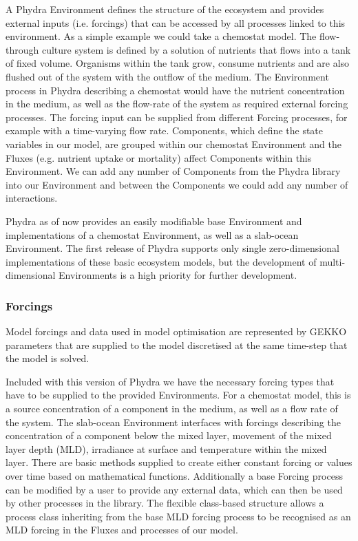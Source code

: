 \documentclass[template.tex]{subfiles}
\begin{document}
A Phydra Environment defines the structure of the ecosystem and provides external inputs (i.e. forcings) that can be accessed by all processes linked to this environment. As a simple example we could take a chemostat model. The flow-through culture system is defined by a solution of nutrients that flows into a tank of fixed volume. Organisms within the tank grow, consume nutrients and are also flushed out of the system with the outflow of the medium. The Environment process in Phydra describing a chemostat would have the nutrient concentration in the medium, as well as the flow-rate of the system as required external forcing processes. The forcing input can be supplied from different Forcing processes, for example with a time-varying flow rate. Components, which define the state variables in our model, are grouped within our chemostat Environment and the Fluxes (e.g. nutrient uptake or mortality) affect Components within this Environment. We can add any number of Components from the Phydra library into our Environment and between the Components we could add any number of interactions.

Phydra as of now provides an easily modifiable base Environment and implementations of a chemostat Environment, as well as a slab-ocean Environment. The first release of Phydra supports only single zero-dimensional implementations of these basic ecosystem models, but the development of multi-dimensional Environments is a high priority for further development.

\subsubsection{Forcings} \label{Section:ForcingSection}

Model forcings and data used in model optimisation are represented by GEKKO parameters that are supplied to the model discretised at the same time-step that the model is solved.

Included with this version of Phydra we have the necessary forcing types that have to be supplied to the provided Environments. For a chemostat model, this is a source concentration of a component in the medium, as well as a flow rate of the system. The slab-ocean Environment interfaces with forcings describing the concentration of a component below the mixed layer, movement of the mixed layer depth (MLD), irradiance at surface and temperature within the mixed layer. There are basic methods supplied to create either constant forcing or values over time based on mathematical functions. Additionally a base Forcing process can be modified by a user to provide any external data, which can then be used by other processes in the library. The flexible class-based structure allows a process class inheriting from the base MLD forcing process to be recognised as an MLD forcing in the Fluxes and processes of our model.
\end{document}
